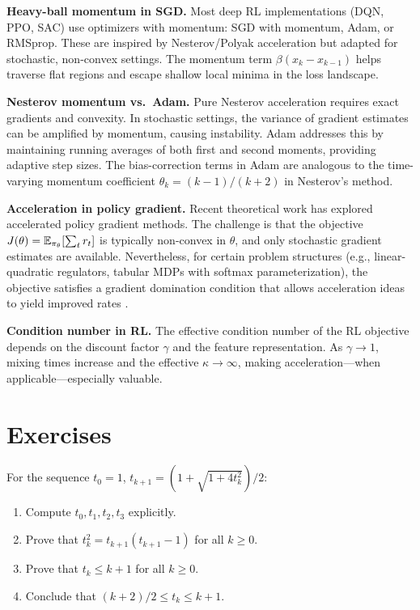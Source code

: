 \documentclass[11pt,a4paper]{article}
\begin{document}
\begin{rlconnection}[title={Momentum in Policy Optimization}]
\textbf{Heavy-ball momentum in SGD.} Most deep RL implementations
(DQN, PPO, SAC) use optimizers with momentum: SGD with momentum,
Adam, or RMSprop. These are inspired by Nesterov/Polyak acceleration
but adapted for stochastic, non-convex settings. The momentum term
$\beta(x_k - x_{k-1})$ helps traverse flat regions and escape
shallow local minima in the loss landscape.

\textbf{Nesterov momentum vs.\ Adam.} Pure Nesterov acceleration
requires exact gradients and convexity. In stochastic settings, the
variance of gradient estimates can be amplified by momentum, causing
instability. Adam addresses this by maintaining running averages of
both first and second moments, providing adaptive step sizes. The
bias-correction terms in Adam are analogous to the time-varying
momentum coefficient $\theta_k = (k-1)/(k+2)$ in Nesterov's method.

\textbf{Acceleration in policy gradient.} Recent theoretical work
has explored accelerated policy gradient methods. The challenge is
that the objective $J(\theta) = \mathbb{E}_{\pi_\theta}[\sum_t r_t]$ is
typically non-convex in $\theta$, and only stochastic gradient
estimates are available. Nevertheless, for certain problem structures
(e.g., linear-quadratic regulators, tabular MDPs with softmax
parameterization), the objective satisfies a gradient domination
condition that allows acceleration ideas to yield improved rates
\citep{nesterov2004}.

\textbf{Condition number in RL.} The effective condition number of
the RL objective depends on the discount factor $\gamma$ and the
feature representation. As $\gamma \to 1$, mixing times increase
and the effective $\kappa \to \infty$, making acceleration---when
applicable---especially valuable.
\end{rlconnection}


\section{Exercises}\label{sec:exercises}

\begin{exercise}\label{ex:tk-verify}
For the sequence $t_0 = 1$,
$t_{k+1} = (1 + \sqrt{1+4t_k^2})/2$:
\begin{enumerate}[label=(\alph*)]
  \item Compute $t_0, t_1, t_2, t_3$ explicitly.
  \item Prove that $t_k^2 = t_{k+1}(t_{k+1} - 1)$ for all $k \ge 0$.
  \item Prove that $t_k \le k + 1$ for all $k \ge 0$.
  \item Conclude that $(k+2)/2 \le t_k \le k+1$.
\end{enumerate}
\end{exercise}
\end{document}
